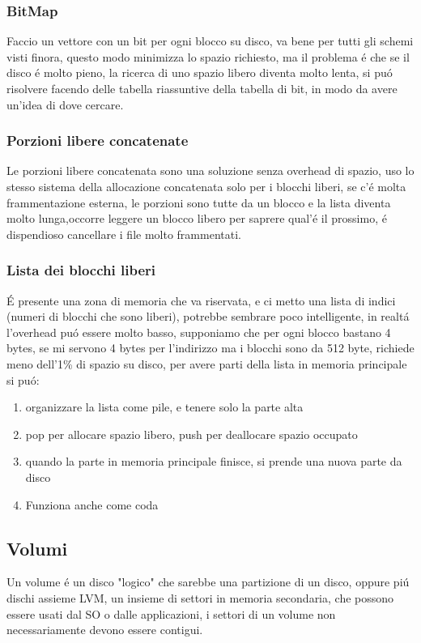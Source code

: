 \subsubsection*{BitMap}
Faccio un vettore con un bit per ogni blocco su disco, va bene per tutti gli schemi visti finora, questo modo minimizza lo spazio richiesto,
ma il problema é che se il disco é molto pieno, la ricerca di uno spazio libero diventa molto lenta, si puó risolvere facendo delle tabella
riassuntive della tabella di bit, in modo da avere un'idea di dove cercare.
\subsubsection*{Porzioni libere concatenate}
Le porzioni libere concatenata sono una soluzione senza overhead di spazio, uso lo stesso sistema della allocazione concatenata solo per i
blocchi liberi, se c'é molta frammentazione esterna, le porzioni sono tutte da un blocco e la lista diventa molto lunga,occorre leggere un blocco libero per
saprere qual'é il prossimo, é dispendioso cancellare i file molto frammentati.
\subsubsection*{Lista dei blocchi liberi}
É presente una zona di memoria che va riservata, e ci metto una lista di indici (numeri di blocchi che sono liberi), potrebbe
sembrare poco intelligente, in realtá l'overhead puó essere molto basso, supponiamo che per ogni blocco bastano 4 bytes,
se mi servono 4 bytes per l'indirizzo ma i blocchi sono da 512 byte, richiede meno dell'1\% di spazio su disco, per avere parti della
lista in memoria principale si puó:
\begin{enumerate}
    \item organizzare la lista come pile, e tenere solo la parte alta
    \item pop per allocare spazio libero, push per deallocare spazio occupato
    \item quando la parte in memoria principale finisce, si prende una nuova parte da disco
    \item Funziona anche come coda
\end{enumerate}
\subsection{Volumi}
Un volume é un disco "logico" che sarebbe una partizione di un disco, oppure piú dischi assieme LVM, un insieme di settori in memoria secondaria,
che possono  essere usati dal SO o dalle applicazioni, i settori di un volume non necessariamente devono essere contigui.
